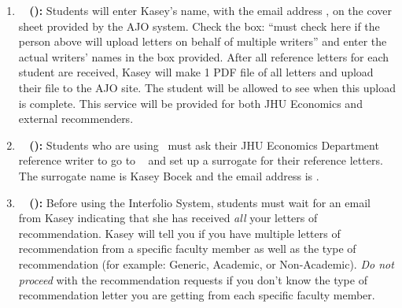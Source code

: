 \documentclass{econtex}
\begin{document}
\begin{enumerate}
\begin{itemize}
\end{itemize}

\item {\bf \AJO ~ (\AJOLink):}
Students will enter Kasey's name, with the email address \JMStaffEmail, on the cover sheet provided by the AJO system. Check the box: ``must check here if the person above will upload letters on behalf of multiple writers'' and enter the actual writers' names in the box provided. After all reference letters for each student are received, Kasey will make 1 PDF file of all letters and upload their file to the AJO site. The student will be allowed to see when this upload is complete. This service will be provided for both JHU Economics and external recommenders.

\item {\bf \AEA ~ (\AEALink):}
Students who are using \AEA~must ask their JHU Economics Department reference writer to go to \AEARecLink~ and set up a surrogate for their reference letters. The surrogate name is Kasey Bocek and the email address is \JMStaffEmail. %


\item {\bf \Interfolio ~ (\InterfolioLink):}
Before using the Interfolio System, students must wait for an email from Kasey indicating that she has received {\it all} your letters of recommendation. Kasey will tell you if you have multiple letters of recommendation from a specific faculty member as well as the type of recommendation (for example: Generic, Academic, or Non-Academic). {\it Do not proceed} with the recommendation requests if you don't know the type of recommendation letter you are getting from each specific faculty member.


\end{enumerate}
\end{document}
